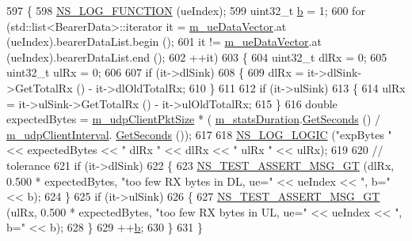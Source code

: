 \begin{DoxyCode}
597 \{
598   \hyperlink{log-macros-disabled_8h_a90b90d5bad1f39cb1b64923ea94c0761}{NS\_LOG\_FUNCTION} (ueIndex);
599   uint32\_t \hyperlink{buildings__pathloss_8m_a21ad0bd836b90d08f4cf640b4c298e7c}{b} = 1;
600   \textcolor{keywordflow}{for} (std::list<BearerData>::iterator it = \hyperlink{classLteX2HandoverMeasuresTestCase_ae4fab68537e923187590910f07df7df5}{m\_ueDataVector}.at (ueIndex).bearerDataList.begin 
      ();
601        it != \hyperlink{classLteX2HandoverMeasuresTestCase_ae4fab68537e923187590910f07df7df5}{m\_ueDataVector}.at (ueIndex).bearerDataList.end ();
602        ++it)
603     \{
604       uint32\_t dlRx = 0;
605       uint32\_t ulRx = 0;
606 
607       \textcolor{keywordflow}{if} (it->dlSink)
608         \{
609           dlRx = it->dlSink->GetTotalRx () - it->dlOldTotalRx;
610         \}
611 
612       \textcolor{keywordflow}{if} (it->ulSink)
613         \{
614           ulRx = it->ulSink->GetTotalRx () - it->ulOldTotalRx;
615         \}
616       \textcolor{keywordtype}{double} expectedBytes = \hyperlink{classLteX2HandoverMeasuresTestCase_af30c91ac30000f68beb31775b72b480e}{m\_udpClientPktSize} * (
      \hyperlink{classLteX2HandoverMeasuresTestCase_a71c9a56babae7f1292626c29c8e376a2}{m\_statsDuration}.\hyperlink{classns3_1_1Time_a8f20d5c3b0902d7b4320982f340b57c8}{GetSeconds} () / \hyperlink{classLteX2HandoverMeasuresTestCase_a64350a88e12b4f90ed812e5635febeab}{m\_udpClientInterval}.
      \hyperlink{classns3_1_1Time_a8f20d5c3b0902d7b4320982f340b57c8}{GetSeconds} ());
617 
618       \hyperlink{group__logging_ga88acd260151caf2db9c0fc84997f45ce}{NS\_LOG\_LOGIC} (\textcolor{stringliteral}{"expBytes "} << expectedBytes << \textcolor{stringliteral}{" dlRx "} << dlRx << \textcolor{stringliteral}{" ulRx "} << ulRx);
619 
620       \textcolor{comment}{//                                tolerance}
621       \textcolor{keywordflow}{if} (it->dlSink)
622         \{
623           \hyperlink{group__testing_ga868cfb773df312b867a506bdd2e3cbef}{NS\_TEST\_ASSERT\_MSG\_GT} (dlRx,   0.500 * expectedBytes, \textcolor{stringliteral}{"too few RX bytes in
       DL, ue="} << ueIndex << \textcolor{stringliteral}{", b="} << b);
624         \}
625       \textcolor{keywordflow}{if} (it->ulSink)
626         \{
627           \hyperlink{group__testing_ga868cfb773df312b867a506bdd2e3cbef}{NS\_TEST\_ASSERT\_MSG\_GT} (ulRx,   0.500 * expectedBytes, \textcolor{stringliteral}{"too few RX bytes in
       UL, ue="} << ueIndex << \textcolor{stringliteral}{", b="} << b);
628         \}
629       ++\hyperlink{buildings__pathloss_8m_a21ad0bd836b90d08f4cf640b4c298e7c}{b};
630     \}
631 \}
\end{DoxyCode}


